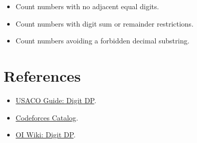 \begin{itemize}
  \item Count numbers with no adjacent equal digits.
  \item Count numbers with digit sum or remainder restrictions.
  \item Count numbers avoiding a forbidden decimal substring.
\end{itemize}

\section*{References}

\begin{itemize}
  \item \href{https://usaco.guide/gold/digit-dp?lang=cpp}{USACO Guide: Digit DP}.
  \item \href{https://codeforces.com/catalog}{Codeforces Catalog}.
  \item \href{https://oiwiki.org/dp/number/}{OI Wiki: Digit DP}.
\end{itemize}
